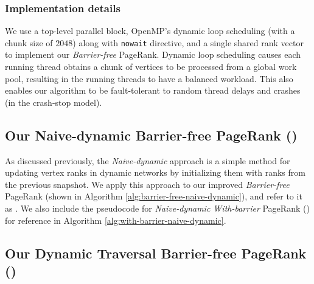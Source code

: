 



\subsubsection{Implementation details}

We use a top-level parallel block, OpenMP's dynamic loop scheduling (with a chunk size of $2048$) along with \verb|nowait| directive, and a single shared rank vector to implement our \textit{Barrier-free} PageRank. Dynamic loop scheduling causes each running thread obtains a chunk of vertices to be processed from a global work pool, resulting in the running threads to have a balanced workload. This also enables our algorithm to be fault-tolerant to random thread delays and crashes (in the crash-stop model).




\subsection{Our Naive-dynamic Barrier-free PageRank (\NaiBarf{})}
\label{sec:naive}

As discussed previously, the \textit{Naive-dynamic} approach is a simple method for updating vertex ranks in dynamic networks by initializing them with ranks from the previous snapshot. We apply this approach to our improved \textit{Barrier-free} PageRank (shown in Algorithm \ref{alg:barrier-free-naive-dynamic}), and refer to it as \NaiBarf{}. We also include the pseudocode for \textit{Naive-dynamic With-barrier} PageRank (\NaiWbar{}) for reference in Algorithm \ref{alg:with-barrier-naive-dynamic}.

% 
% 




\subsection{Our Dynamic Traversal Barrier-free PageRank (\TraBarf{})}
\label{sec:traversal}

